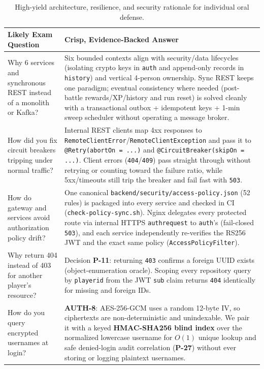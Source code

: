 \documentclass[10.5pt,a4paper]{article}
\DeclareRobustCommand{\code}[1]{\begingroup\def\_{\textunderscore\allowbreak}\texttt{#1}\endgroup}
\begin{document}
\begin{table}[H]
\centering
\caption{High-yield architecture, resilience, and security rationale for individual oral defense.}
\label{tab:oral}
\footnotesize
\begin{tabularx}{\linewidth}{@{}L{4.2cm}Y@{}}
\toprule
\textbf{Likely Exam Question} & \textbf{Crisp, Evidence-Backed Answer} \\
\midrule
Why 6 services and synchronous REST instead of a monolith or Kafka? &
Six bounded contexts align with security/data lifecycles (isolating crypto keys in \code{auth} and append-only records in \code{history}) and vertical 4-person ownership. Sync REST keeps one paradigm; eventual consistency where needed (post-battle rewards/XP/history and run reset) is solved cleanly with a transactional outbox + idempotent keys + 1-min sweep scheduler without operating a message broker. \\
\addlinespace
How did you fix circuit breakers tripping under normal traffic? &
Internal REST clients map 4xx responses to \code{RemoteClientError}/\code{RemoteClientException} and pass it to \code{@Retry(abortOn = ...)} and \code{@CircuitBreaker(skipOn = ...)}. Client errors (\code{404}/\code{409}) pass straight through without retrying or counting toward the failure ratio, while 5xx/timeouts still trip the breaker and fail fast with \code{503}. \\
\addlinespace
How do gateway and services avoid authorization policy drift? &
One canonical \code{backend/security/access-policy.json} (52 rules) is packaged into every service and checked in CI (\code{check-policy-sync.sh}). Nginx delegates every protected route via internal HTTPS \code{auth\_request} to \code{auth}'s  (fail-closed \code{503}), and each service independently re-verifies the RS256 JWT and the exact same policy (\code{AccessPolicyFilter}). \\
\addlinespace
Why return 404 instead of 403 for another player's resource? &
Decision \textbf{P-11}: returning \code{403} confirms a foreign UUID exists (object-enumeration oracle). Scoping every repository query by \code{player\_id} from the JWT \code{sub} claim returns \code{404} identically for missing and foreign IDs. \\
\addlinespace
How do you query encrypted usernames at login? &
\textbf{AUTH-8}: AES-256-GCM uses a random 12-byte IV, so ciphertexts are non-deterministic and unindexable. We pair it with a keyed \textbf{HMAC-SHA256 blind index} over the normalized lowercase username for $O(1)$ unique lookup and safe denied-login audit correlation (\textbf{P-27}) without ever storing or logging plaintext usernames. \\

\end{tabularx}
\end{table}
\end{document}
